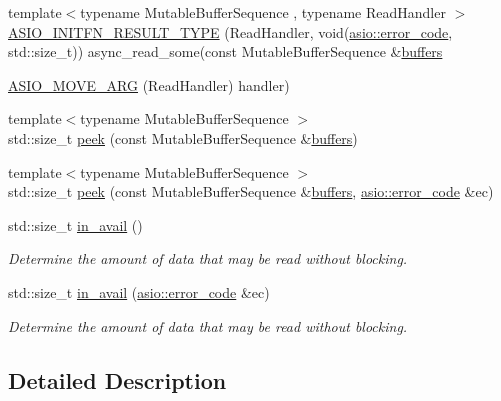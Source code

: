 \begin{DoxyCompactItemize}
\item 
{\footnotesize template$<$typename Mutable\+Buffer\+Sequence , typename Read\+Handler $>$ }\\\hyperlink{classasio_1_1buffered__read__stream_ad485405750c00852c21194ea43105436}{A\+S\+I\+O\+\_\+\+I\+N\+I\+T\+F\+N\+\_\+\+R\+E\+S\+U\+L\+T\+\_\+\+T\+Y\+P\+E} (Read\+Handler, void(\hyperlink{classasio_1_1error__code}{asio\+::error\+\_\+code}, std\+::size\+\_\+t)) async\+\_\+read\+\_\+some(const Mutable\+Buffer\+Sequence \&\hyperlink{group__async__read_ga54dede45c3175148a77fe6635222c47d}{buffers}
\item 
\hyperlink{classasio_1_1buffered__read__stream_adf2e69491d58b8510635f5cd31df9ce1}{A\+S\+I\+O\+\_\+\+M\+O\+V\+E\+\_\+\+A\+R\+G} (Read\+Handler) handler)
\item 
{\footnotesize template$<$typename Mutable\+Buffer\+Sequence $>$ }\\std\+::size\+\_\+t \hyperlink{classasio_1_1buffered__read__stream_ae2de2771e7a497f83c15392469e2ad3b}{peek} (const Mutable\+Buffer\+Sequence \&\hyperlink{group__async__read_ga54dede45c3175148a77fe6635222c47d}{buffers})
\item 
{\footnotesize template$<$typename Mutable\+Buffer\+Sequence $>$ }\\std\+::size\+\_\+t \hyperlink{classasio_1_1buffered__read__stream_a84d9480ccaf7414cb58f3a1f32f611d6}{peek} (const Mutable\+Buffer\+Sequence \&\hyperlink{group__async__read_ga54dede45c3175148a77fe6635222c47d}{buffers}, \hyperlink{classasio_1_1error__code}{asio\+::error\+\_\+code} \&ec)
\item 
std\+::size\+\_\+t \hyperlink{classasio_1_1buffered__read__stream_a73537967bde75b2134e31f83b4e03e7d}{in\+\_\+avail} ()
\begin{DoxyCompactList}\small\item\em Determine the amount of data that may be read without blocking. \end{DoxyCompactList}\item 
std\+::size\+\_\+t \hyperlink{classasio_1_1buffered__read__stream_a3742dc57c776d8653662cbd0410d0b2d}{in\+\_\+avail} (\hyperlink{classasio_1_1error__code}{asio\+::error\+\_\+code} \&ec)
\begin{DoxyCompactList}\small\item\em Determine the amount of data that may be read without blocking. \end{DoxyCompactList}\end{DoxyCompactItemize}


\subsection{Detailed Description}
